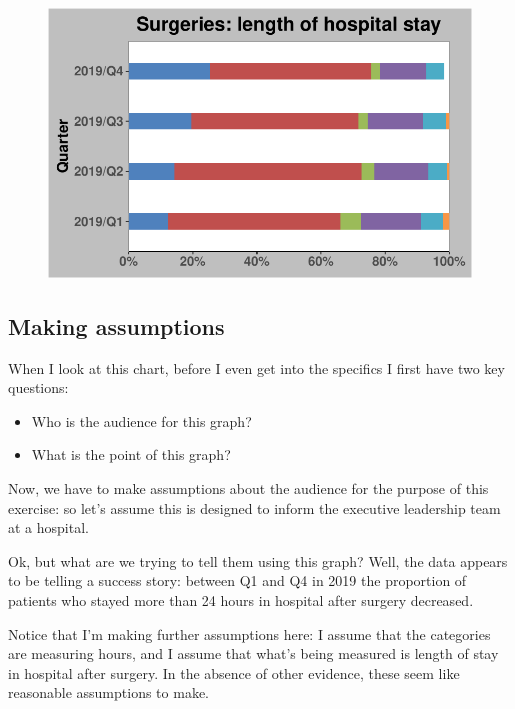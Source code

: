 \documentclass[
  letterpaper,
  DIV=11,
  numbers=noendperiod]{scrartcl}
\providecommand{\tightlist}{%
  \setlength{\itemsep}{0pt}\setlength{\parskip}{0pt}}\usepackage{longtable,booktabs,array}
\begin{document}
\begin{figure}[H]

{\centering \includegraphics{graph_makeover_files/figure-pdf/unnamed-chunk-3-1.pdf}

}

\end{figure}

\hypertarget{making-assumptions}{%
\subsection{Making assumptions}\label{making-assumptions}}

When I look at this chart, before I even get into the specifics I first
have two key questions:

\begin{itemize}
\tightlist
\item
  Who is the audience for this graph?
\item
  What is the point of this graph?
\end{itemize}

Now, we have to make assumptions about the audience for the purpose of
this exercise: so let's assume this is designed to inform the executive
leadership team at a hospital.

Ok, but what are we trying to tell them using this graph? Well, the data
appears to be telling a success story: between Q1 and Q4 in 2019 the
proportion of patients who stayed more than 24 hours in hospital after
surgery decreased.

Notice that I'm making further assumptions here: I assume that the
categories are measuring hours, and I assume that what's being measured
is length of stay in hospital after surgery. In the absence of other
evidence, these seem like reasonable assumptions to make.
\end{document}
